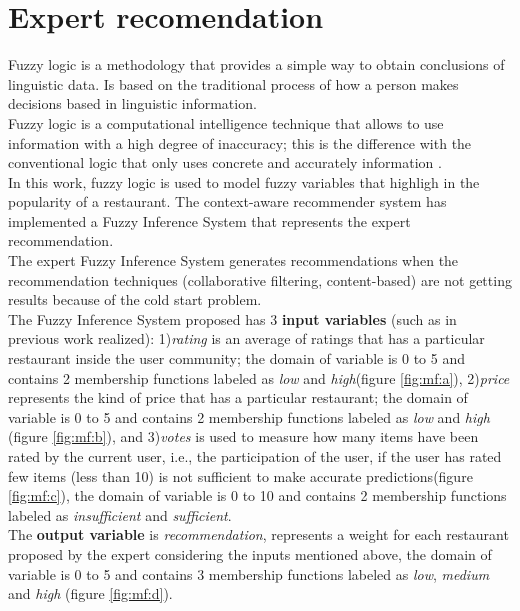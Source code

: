 \section{Expert recomendation} 

Fuzzy logic is a methodology that provides a simple way to obtain
conclusions of linguistic data. Is based on the traditional process of
how a person makes decisions based in linguistic information. \\    Fuzzy
logic is a computational intelligence technique that allows to use
information with a high degree of inaccuracy; this is the difference
with the conventional logic that only uses concrete and accurately
information \cite{zedeh1989knowledge}.\\  In this work, fuzzy logic is
used to model fuzzy variables that highligh in the popularity of a
restaurant. The context-aware recommender system has implemented a
Fuzzy Inference System that represents the expert recommendation. \\   The
expert Fuzzy Inference System generates recommendations when the
recommendation techniques (collaborative filtering, content-based) are
not getting results because of the cold start problem.\\   The Fuzzy
Inference System proposed has 3 \textbf{input variables} (such as in
previous work realized\cite{garcia2009hybrid}): 1)\textit{rating} is
an average of ratings that has a particular restaurant inside the user
community; the domain of variable is 0 to 5 and contains 2 membership
functions labeled as \textit{low} and \textit{high}(figure
\ref{fig:mf:a}), 2)\textit{price} represents the kind of price that
has a particular restaurant; the domain of variable is 0 to 5 and
contains 2 membership functions labeled as \textit{low} and
\textit{high} (figure \ref{fig:mf:b}), and 3)\textit{votes} is used to
measure how many items have been rated by the current user, i.e., the
participation of the user, if the user has rated few items (less than
10) is not sufficient to make accurate predictions(figure
\ref{fig:mf:c}), the domain of variable is 0 to 10 and contains 2
membership functions labeled as \textit{insufficient} and
\textit{sufficient}. \\   The \textbf{output variable} is
\textit{recommendation}, represents a weight for each restaurant
proposed by the expert considering the inputs mentioned above, the
domain of variable is 0 to 5 and contains 3 membership functions
labeled as \textit{low}, \textit{medium} and \textit{high} (figure
\ref{fig:mf:d}).

